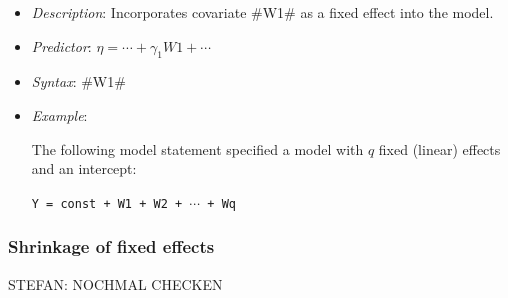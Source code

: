 \begin{itemize}
\item[] {\em Description}: Incorporates covariate #W1# as a fixed effect into the model.
\item[] {\em Predictor}: $\eta =  \cdots + \gamma_1 W1 + \cdots$
\item[] {\em Syntax}: #W1#
\item[] {\em Example}:

The following model statement specified a model with $q$ fixed
(linear) effects and an intercept:

\texttt{Y = const + W1 + W2 + $\cdots$ + Wq}
\end{itemize}

\subsubsection*{Shrinkage of fixed effects}

STEFAN: NOCHMAL CHECKEN


